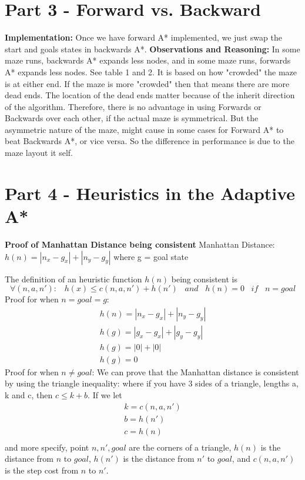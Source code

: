 \documentclass[10pt]{article}
\begin{document}
\section*{Part 3 - Forward vs. Backward}

\textbf{Implementation:} Once we have forward A* implemented, we just swap the start and goals states in backwards A*. \textbf{Observations and Reasoning:}
In some maze runs, backwards A* expands less nodes, and in some maze runs, forwards A* expands less nodes. See table 1 and 2. It is based on how "crowded" the maze is at either end. If the maze is more "crowded" then that means there are more dead ends. The location of the dead ends matter because of the inherit direction of the algorithm. Therefore, there is no advantage in using Forwards or Backwards over each other, if the actual maze is symmetrical. But the asymmetric nature of the maze, might cause in some cases for Forward A* to beat Backwards A*, or vice versa. So the difference in performance is due to the maze layout it self. 




\section*{Part 4 - Heuristics in the Adaptive A*}

\textbf{Proof of Manhattan Distance being consistent}
Manhattan Distance: \(h(n) = |n_x - g_x|+|n_y - g_y|\) where g = goal state

The definition of an heuristic function \(h(n)\) being consistent is \[\forall(n, a, n'):\;\;\;h(x) \le c(n, a, n') + h(n') \;\;\; and \;\;\; h(n) = 0 \;\;\; if \;\;\; n = goal\]
Proof for when \(n = goal = g\): 
\begin{gather*} 
h(n) = |n_x - g_x|+|n_y - g_y| \\ 
h(g) = |g_x - g_x|+|g_y - g_y| \\
h(g) = |0|+|0| \\
h(g) = 0
\end{gather*}
Proof for when \(n \ne goal\):
We can prove that the Manhattan distance is consistent by using the triangle inequality: where if you have 3 sides of a triangle, lengths a, k and c, then \(c \le k +b\). If we let
\begin{gather*} 
k = c(n, a, n') \\
b = h(n') \\
c = h(n) \\
\end{gather*}
and more specify, point \(n, n', goal\) are the corners of a triangle, \(h(n)\) is the distance from \(n\) to \(goal\), \(h(n')\) is the distance from \(n'\) to \(goal\), and \(c(n, a, n')\) is the step cost from \(n\) to \(n'\).  
\end{document}
